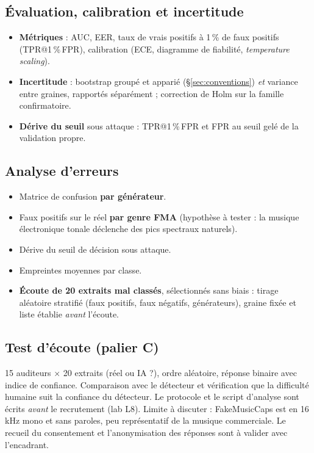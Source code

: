 \documentclass[11pt,a4paper]{article}
\makeatletter
\newcommand{\tprfpr}{TPR@1\,\%\,FPR}
\makeatother
\begin{document}
\subsection{Évaluation, calibration et incertitude}

\begin{itemize}
  \item \textbf{Métriques} : AUC, EER, taux de vrais positifs à 1\,\% de faux positifs (\tprfpr), calibration (ECE, diagramme de fiabilité, \emph{temperature scaling}).
  \item \textbf{Incertitude} : bootstrap groupé et apparié (\S\ref{sec:conventions}) \emph{et} variance entre graines, rapportés séparément ; correction de Holm sur la famille confirmatoire.
  \item \textbf{Dérive du seuil} sous attaque : \tprfpr{} et FPR au seuil gelé de la validation propre.
\end{itemize}

\subsection{Analyse d'erreurs}

\begin{itemize}
  \item Matrice de confusion \textbf{par générateur}.
  \item Faux positifs sur le réel \textbf{par genre FMA} (hypothèse à tester : la musique électronique tonale déclenche des pics spectraux naturels).
  \item Dérive du seuil de décision sous attaque.
  \item Empreintes moyennes par classe.
  \item \textbf{Écoute de 20 extraits mal classés}, sélectionnés sans biais : tirage aléatoire stratifié (faux positifs, faux négatifs, générateurs), graine fixée et liste établie \emph{avant} l'écoute.
\end{itemize}

\subsection{Test d'écoute (palier C)}

15 auditeurs $\times$ 20 extraits (réel ou IA ?), ordre aléatoire, réponse binaire avec indice de confiance. Comparaison avec le détecteur et vérification que la difficulté humaine suit la confiance du détecteur. Le protocole et le script d'analyse sont écrits \emph{avant} le recrutement (lab L8). Limite à discuter : FakeMusicCaps est en 16\,kHz mono et sans paroles, peu représentatif de la musique commerciale. Le recueil du consentement et l'anonymisation des réponses sont à valider avec l'encadrant.
\end{document}
